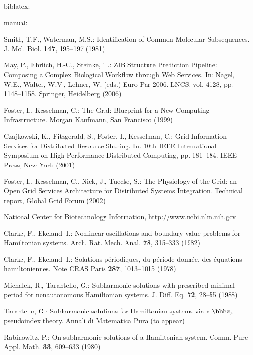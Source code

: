 \documentclass{llncs}
\begin{document}
\nocite{*} biblatex:
\printbibliography

\newpage
manual:
\begin{thebibliography}{10}
Smith, T.F., Waterman, M.S.:
Identification of Common Molecular Subsequences.
J. Mol. Biol. \textbf{147}, 195--197 (1981)

May, P., Ehrlich, H.-C., Steinke, T.:
ZIB Structure Prediction Pipeline: Composing a Complex Biological Workflow through Web Services.
In: Nagel, W.E., Walter, W.V., Lehner, W. (eds.) Euro-Par 2006.
LNCS, vol. 4128, pp. 1148--1158. Springer, Heidelberg (2006)

Foster, I., Kesselman, C.:
The Grid: Blueprint for a New Computing Infrastructure.
Morgan Kaufmann, San Francisco (1999)

Czajkowski, K., Fitzgerald, S., Foster, I., Kesselman, C.:
Grid Information Services for Distributed Resource Sharing.
In: 10th IEEE International Symposium on High Performance Distributed Computing,
pp. 181--184. IEEE Press, New York (2001)

Foster, I., Kesselman, C., Nick, J., Tuecke, S.:
The Physiology of the Grid:
an Open Grid Services Architecture for Distributed Systems Integration.
Technical report, Global Grid Forum (2002)

National Center for Biotechnology Information,
\url{http://www.ncbi.nlm.nih.gov}

Clarke, F., Ekeland, I.:
Nonlinear oscillations and boundary-value problems for Hamiltonian systems.
Arch. Rat. Mech. Anal. \textbf{78}, 315--333 (1982)

Clarke, F., Ekeland, I.:
Solutions p\'{e}riodiques, du p\'{e}riode donn\'{e}e, des \'{e}quations hamiltoniennes.
Note CRAS Paris \textbf{287}, 1013--1015 (1978)

Michalek, R., Tarantello, G.:
Subharmonic solutions with prescribed minimal period for nonautonomous Hamiltonian systems.
J. Diff. Eq. \textbf{72}, 28--55 (1988)

Tarantello, G.:
Subharmonic solutions for Hamiltonian systems via a $\bbbz_{p}$ pseudoindex theory.
Annali di Matematica Pura (to appear)

Rabinowitz, P.:
On subharmonic solutions of a Hamiltonian system.
Comm. Pure Appl. Math. \textbf{33}, 609--633 (1980)
\end{thebibliography}
\end{document}
